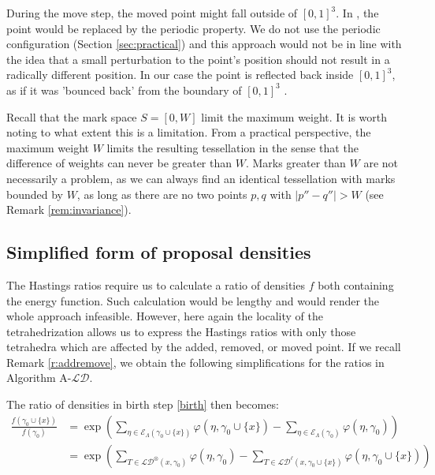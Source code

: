 

During the move step, the moved point might fall outside of $[0,1]^3$. In \cite{DereudreLavancier2011}, the point would be replaced by the periodic property. We do not use the periodic configuration (Section \ref{sec:practical}) and this approach would not be in line with the idea that a small perturbation to the point's position should not result in a radically different position. 
In our case the point is reflected back inside $[0,1]^3$, as if it was 'bounced back' from the boundary of $[0,1]^3$ .

\begin{remark}
Recall that the mark space $S=[0,W]$ limit the maximum weight. It is worth noting to what extent this is a limitation. From a practical perspective, the maximum weight $W$ limits the resulting tessellation in the sense that the difference of weights can never be greater than $W$. Marks greater than $W$ are not necessarily a problem, as we can always find an identical tessellation with marks bounded by $W$, as long as there are no two points $p,q$ with $|p''-q''|>W$ (see Remark \ref{rem:invariance}).
\end{remark}


\subsection{Simplified form of proposal densities}
The Hastings ratios require us to calculate a ratio of densities $f$ both containing the energy function. Such calculation would be lengthy and would render the whole approach infeasible. However, here again the locality of the tetrahedrization allows us to express the Hastings ratios with only those tetrahedra which are affected by the added, removed, or moved point. If we recall Remark \ref{r:addremove}, we obtain the following simplifications for the ratios in Algorithm A-$\mathcal {LD}$.

The ratio of densities in birth step \eqref{birth} then becomes:
\begin{align*}
\frac{f(\gamma_0 \cup\{x\})}{f(\gamma_0)} &= \exp\left({\sum_{\eta\in \mathcal E_\Lambda(\gamma_0 \cup\{x\})} \varphi(\eta,\gamma_0 \cup\{x\}) - \sum_{\eta\in \mathcal E_\Lambda(\gamma_0)}\varphi(\eta,\gamma_0)}\right) \\
&= \exp\left(  \sum_{T \in \mathcal {LD}^\otimes (x,\gamma_0)} \varphi(\eta,\gamma_0)  - \sum_{T\in \mathcal {LD}^\ell (x,\gamma_0 \cup\{x\})} \varphi(\eta,\gamma_0 \cup\{x\}) \right)  
\end{align*}


